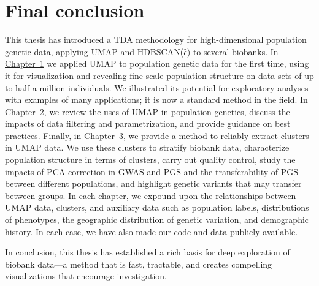 \section{Final conclusion}
This thesis has introduced a TDA methodology for high-dimensional population genetic data, applying UMAP and HDBSCAN($\hat{\epsilon}$) to several biobanks. In \hyperref[chap:chapter1]{Chapter~1} we applied UMAP to population genetic data for the first time, using it for visualization and revealing fine-scale population structure on data sets of up to half a million individuals. We illustrated its potential for exploratory analyses with examples of many applications; it is now a standard method in the field. In \hyperref[chap:chapter2]{Chapter~2}, we review the uses of UMAP in population genetics, discuss the impacts of data filtering and parametrization, and provide guidance on best practices. Finally, in \hyperref[chap:chapter3]{Chapter~3}, we provide a method to reliably extract clusters in UMAP data. We use these clusters to stratify biobank data, characterize population structure in terms of clusters, carry out quality control, study the impacts of PCA correction in GWAS and PGS and the transferability of PGS between different populations, and highlight genetic variants that may transfer between groups. In each chapter, we expound upon the relationships between UMAP data, clusters, and auxiliary data such as population labels, distributions of phenotypes, the geographic distribution of genetic variation, and demographic history. In each case, we have also made our code and data publicly available. 

In conclusion, this thesis has established a rich basis for deep exploration of biobank data---a method that is fast, tractable, and creates compelling visualizations that encourage investigation.

\clearpage


